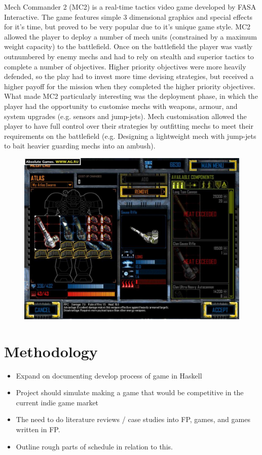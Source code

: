 Mech Commander 2 (MC2) is a real-time tactics video game developed by FASA Interactive. The game features simple 3 dimensional graphics and special effects for it's time, but proved to be very popular due to it's unique game style. MC2 allowed the player to deploy a number of mech units (constrained by a maximum weight capacity) to the battlefield. Once on the battlefield the player was vastly outnumbered by enemy mechs and had to rely on stealth and superior tactics to complete a number of objectives. Higher priority objectives were more heavily defended, so the play had to invest more time devising strategies, but received a higher payoff for the mission when they completed the higher priority objectives. What made MC2 particularly interesting was the deployment phase, in which the player had the opportunity to customise mechs with weapons, armour, and system upgrades (e.g. sensors and jump-jets). Mech customisation allowed the player to have full control over their strategies by outfitting mechs to meet their requirements on the battlefield (e.g. Designing a lightweight mech with jump-jets to bait heavier guarding mechs into an ambush).

\begin{figure}
	\includegraphics{res/mc2/atlas_lab}
\end{figure}


\section{Methodology}

\begin{itemize}\itemsep-3pt
	\item Expand on documenting develop process of game in Haskell
	\item Project should simulate making a game that would be competitive in the current indie game market
	\item The need to do literature reviews / case studies into FP, games, and games written in FP.
	\item Outline rough parts of schedule in relation to this.
\end{itemize}




